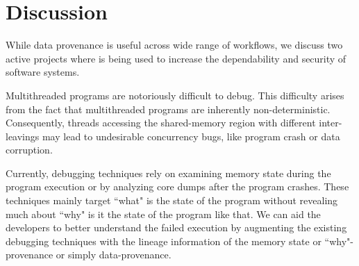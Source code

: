 \section{Discussion}
\label{sec:discussion}
While data provenance is useful across wide range of workflows, we discuss two active projects where \projecttitle is being used to increase the dependability and security of software systems. 

 Multithreaded programs are notoriously difficult to debug. This difficulty arises from the fact that multithreaded programs are inherently non-deterministic. Consequently, threads accessing the shared-memory region with different inter-leavings may lead to undesirable concurrency bugs, like program crash or data corruption. 


Currently, debugging techniques rely on examining memory state during the program execution or by analyzing core dumps after the program crashes. These techniques mainly target ``what" is the state of the program without revealing much about ``why" is it the state of the program like that. We can aid the developers to better understand the failed execution by augmenting the existing debugging techniques with the lineage information of the memory state or ``why"-provenance or simply data-provenance.



